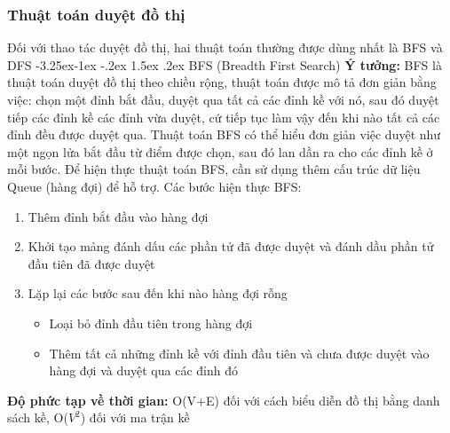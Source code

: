\documentclass[a4paper]{article}
\makeatletter
\newcounter {subsubsubsection}[subsubsection]
\newcommand\subsubsubsection{\@startsection{subsubsubsection}{4}{\z@}%
                                     {-3.25ex\@plus -1ex \@minus -.2ex}%
                                     {1.5ex \@plus .2ex}%
                                     {\normalfont\normalsize\bfseries}}
\makeatother
\begin{document}
        \subsubsection{Thuật toán duyệt đồ thị}
Đối với thao tác duyệt đồ thị, hai thuật toán thường được dùng nhất là BFS và DFS
            \subsubsubsection{BFS (Breadth First Search)}
\textbf{Ý tưởng:} BFS là thuật toán duyệt đồ thị theo chiều rộng, thuật toán được mô tả đơn giản bằng việc: chọn một đỉnh bắt đầu, duyệt qua tất cả các đỉnh kề với nó, sau đó duyệt tiếp các đỉnh kề các đỉnh vừa duyệt, cứ tiếp tục làm vậy đến khi nào tất cả các đỉnh đều được duyệt qua. Thuật toán BFS có thể hiểu đơn giản việc duyệt như một ngọn lửa bắt đầu từ điểm được chọn, sau đó lan dần ra cho các đỉnh kề ở mỗi bước. Để hiện thực thuật toán BFS, cần sử dụng thêm cấu trúc dữ liệu Queue (hàng đợi) để hỗ trợ.
Các bước hiện thực BFS:
\begin{enumerate}
    \item Thêm đỉnh bắt đầu vào hàng đợi 
    \item Khởi tạo mảng đánh dấu các phần tử đã được duyệt và đánh dầu phần tử đầu tiên đã được duyệt
    \item Lặp lại các bước sau đến khi nào hàng đợi rỗng
        \begin{itemize}
            \item Loại bỏ đỉnh đầu tiên trong hàng đợi 
            \item Thêm tất cả những đỉnh kề với đỉnh đầu tiên và chưa được duyệt vào hàng đợi và duyệt qua các đỉnh đó
        \end{itemize}
\end{enumerate}
\textbf{Độ phức tạp về thời gian:} O(V+E) đối với cách biểu diễn đồ thị bằng danh sách kề, O($V^2$) đối với ma trận kề \\
\end{document}
